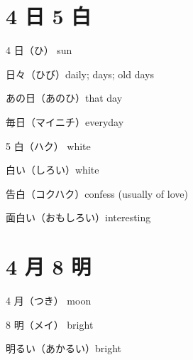 \section{4 日 5 白}

4 日（ひ） sun

日々（ひび）daily; days; old days

あの日（あのひ）that day

毎日（マイニチ）everyday

5 白（ハク） white

白い（しろい）white

告白（コクハク）confess (usually of love)

面白い（おもしろい）interesting

\section{4 月 8 明}

4 月（つき） moon

8 明（メイ） bright

明るい（あかるい）bright
